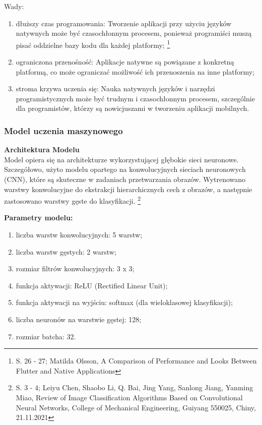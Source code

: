 \documentclass[12pt, a4paper, twoside, openany]{book}
\newcommand{\forceindent}{\leavevmode{\parindent=1.3em\indent}}
\begin{document}
Wady:
\begin{enumerate}[label=--]
    \item dłuższy czas programowania: Tworzenie aplikacji przy użyciu języków natywnych może być czasochłonnym procesem, ponieważ programiści muszą pisać oddzielne bazy kodu dla każdej platformy; \footnote{S. 26 - 27; Matilda Olsson, A Comparison of Performance and Looks Between Flutter and Native Applications}
    \item ograniczona przenośność: Aplikacje natywne są powiązane z konkretną platformą, co może ograniczać możliwość ich przenoszenia na inne platformy;
    \item stroma krzywa uczenia się: Nauka natywnych języków i narzędzi programistycznych może być trudnym i czasochłonnym procesem, szczególnie dla programistów, którzy są nowicjuszami w tworzeniu aplikacji mobilnych.
\end{enumerate}

\subsubsection{Model uczenia maszynowego}

\forceindent \textbf{Architektura Modelu\\}
\indent Model opiera się na architekturze wykorzystującej głębokie sieci neuronowe.
Szczegółowo, użyto modelu opartego na konwolucyjnych sieciach neuronowych (CNN), które są skuteczne w zadaniach przetwarzania obrazów.
Wytrenowano warstwy konwolucyjne do ekstrakcji hierarchicznych cech z obrazów, a następnie zastosowano warstwy gęste do klasyfikacji. \footnote{
    S. 3 - 4; Leiyu Chen, Shaobo Li, Q. Bai, Jing Yang, Sanlong Jiang, Yanming Miao, Review of Image Classification Algorithms Based on Convolutional Neural Networks, College of Mechanical Engineering, Guiyang 550025, Chiny, 21.11.2021
}

\textbf{Parametry modelu:}
\begin{enumerate}[label=--]
    \item liczba warstw konwolucyjnych: 5 warstw;
    \item liczba warstw gęstych: 2 warstw;
    \item rozmiar filtrów konwolucyjnych: 3 x 3;
    \item funkcja aktywacji: ReLU (Rectified Linear Unit);
    \item funkcja aktywacji na wyjściu: softmax (dla wieloklasowej klasyfikacji);
    \item liczba neuronów na warstwie gęstej: 128;
    \item rozmiar batcha: 32.
\end{enumerate}
\end{document}
